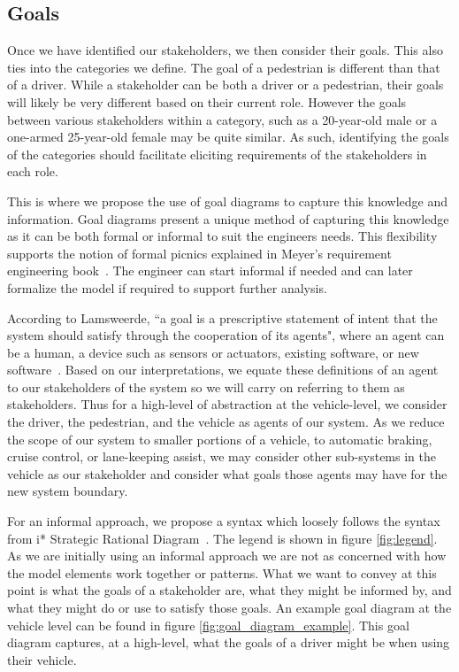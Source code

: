 \subsection{Goals}

Once we have identified our stakeholders, we then consider their goals. This also ties into the categories we define. The goal of a pedestrian is different than that of a driver. While a stakeholder can be both a driver or a pedestrian, their goals will likely be very different based on their current role. However the goals between various stakeholders within a category, such as a 20-year-old male or a one-armed 25-year-old female may be quite similar. As such, identifying the goals of the categories should facilitate eliciting requirements of the stakeholders in each role.

This is where we propose the use of goal diagrams to capture this knowledge and information. Goal diagrams present a unique method of capturing this knowledge as it can be both formal or informal to suit the engineers needs. This flexibility supports the notion of formal picnics explained in Meyer's requirement engineering book~\cite{meyer2022handbook}. The engineer can start informal if needed and can later formalize the model if required to support further analysis. 

According to Lamsweerde, ``a goal is a prescriptive statement of intent that the system should satisfy through the cooperation of its agents", where an agent can be a human, a device such as sensors or actuators, existing software, or new software~\cite{lamsweerde2009requirements}. Based on our interpretations, we equate these definitions of an agent to our stakeholders of the system so we will carry on referring to them as stakeholders. Thus for a high-level of abstraction at the vehicle-level, we consider the driver, the pedestrian, and the vehicle as agents of our system. As we reduce the scope of our system to smaller portions of a vehicle, to automatic braking, cruise control, or lane-keeping assist, we may consider other sub-systems in the vehicle as our stakeholder and consider what goals those agents may have for the new system boundary.

For an informal approach, we propose a syntax which loosely follows the syntax from i* Strategic Rational Diagram~\cite{wautelet2016building, lopez2012specialization}. The legend is shown in figure \ref{fig:legend}. As we are initially using an informal approach we are not as concerned with how the model elements work together or patterns. What we want to convey at this point is what the goals of a stakeholder are, what they might be informed by, and what they might do or use to satisfy those goals. An example goal diagram at the vehicle level can be found in figure \ref{fig:goal_diagram_example}. This goal diagram captures, at a high-level, what the goals of a driver might be when using their vehicle. 

